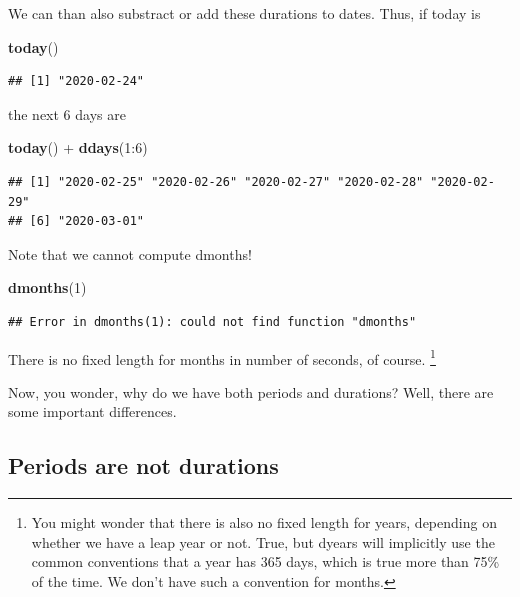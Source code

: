 \documentclass[]{tufte-book}
\newenvironment{Shaded}{}{}
\newcommand{\DecValTok}[1]{\textcolor[rgb]{0.25,0.63,0.44}{#1}}
\newcommand{\KeywordTok}[1]{\textcolor[rgb]{0.00,0.44,0.13}{\textbf{#1}}}
\newcommand{\NormalTok}[1]{#1}
\newcommand{\OperatorTok}[1]{\textcolor[rgb]{0.40,0.40,0.40}{#1}}
\newcommand{\StringTok}[1]{\textcolor[rgb]{0.25,0.44,0.63}{#1}}
\begin{document}
We can than also substract or add these durations to dates. Thus, if today is

\begin{Shaded}
\begin{Highlighting}[]
\KeywordTok{today}\NormalTok{()}
\end{Highlighting}
\end{Shaded}

\begin{verbatim}
## [1] "2020-02-24"
\end{verbatim}

the next 6 days are

\begin{Shaded}
\begin{Highlighting}[]
\KeywordTok{today}\NormalTok{() }\OperatorTok{+}\StringTok{ }\KeywordTok{ddays}\NormalTok{(}\DecValTok{1}\OperatorTok{:}\DecValTok{6}\NormalTok{)}
\end{Highlighting}
\end{Shaded}

\begin{verbatim}
## [1] "2020-02-25" "2020-02-26" "2020-02-27" "2020-02-28" "2020-02-29"
## [6] "2020-03-01"
\end{verbatim}

Note that we cannot compute dmonths!

\begin{Shaded}
\begin{Highlighting}[]
\KeywordTok{dmonths}\NormalTok{(}\DecValTok{1}\NormalTok{)}
\end{Highlighting}
\end{Shaded}

\begin{verbatim}
## Error in dmonths(1): could not find function "dmonths"
\end{verbatim}

There is no fixed length for months in number of seconds, of course. \footnote{You might wonder that there is also no fixed length for years, depending on whether we have a leap year or not. True, but dyears will implicitly use the common conventions that a year has 365 days, which is true more than 75\% of the time. We don't have such a convention for months.}

Now, you wonder, why do we have both periods and durations? Well, there are some important differences.

\hypertarget{periods-are-not-durations}{%
\subsection{Periods are not durations}\label{periods-are-not-durations}}
\end{document}
